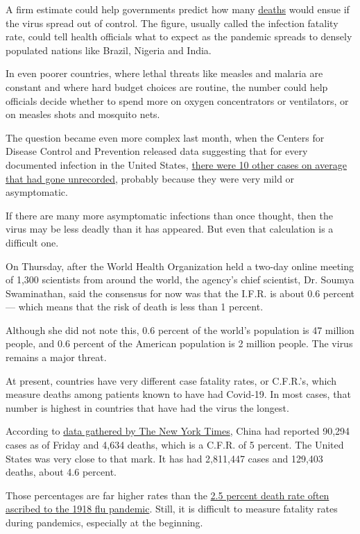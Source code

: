 A firm estimate could help governments predict how many
\href{https://www.nytimes.com/2020/07/22/us/florida-mother-2-children-covid-19.html}{deaths}
would ensue if the virus spread out of control. The figure, usually
called the infection fatality rate, could tell health officials what to
expect as the pandemic spreads to densely populated nations like Brazil,
Nigeria and India.

In even poorer countries, where lethal threats like measles and malaria
are constant and where hard budget choices are routine, the number could
help officials decide whether to spend more on oxygen concentrators or
ventilators, or on measles shots and mosquito nets.

The question became even more complex last month, when the Centers for
Disease Control and Prevention released data suggesting that for every
documented infection in the United States,
\href{https://www.cdc.gov/coronavirus/2019-ncov/cases-updates/commercial-lab-surveys.html}{there
were 10 other cases on average that had gone unrecorded}, probably
because they were very mild or asymptomatic.

If there are many more asymptomatic infections than once thought, then
the virus may be less deadly than it has appeared. But even that
calculation is a difficult one.

On Thursday, after the World Health Organization held a two-day online
meeting of 1,300 scientists from around the world, the agency's chief
scientist, Dr. Soumya Swaminathan, said the consensus for now was that
the I.F.R. is about 0.6 percent --- which means that the risk of death
is less than 1 percent.

Although she did not note this, 0.6 percent of the world's population is
47 million people, and 0.6 percent of the American population is 2
million people. The virus remains a major threat.

At present, countries have very different case fatality rates, or
C.F.R.'s, which measure deaths among patients known to have had
Covid-19. In most cases, that number is highest in countries that have
had the virus the longest.

According to
\href{https://www.nytimes.com/interactive/2020/world/coronavirus-maps.html}{data
gathered by The New York Times}, China had reported 90,294 cases as of
Friday and 4,634 deaths, which is a C.F.R. of 5 percent. The United
States was very close to that mark. It has had 2,811,447 cases and
129,403 deaths, about 4.6 percent.

Those percentages are far higher rates than the
\href{https://wwwnc.cdc.gov/eid/article/12/1/05-0979_article}{2.5
percent death rate often ascribed to the 1918 flu pandemic}. Still, it
is difficult to measure fatality rates during pandemics, especially at
the beginning.

